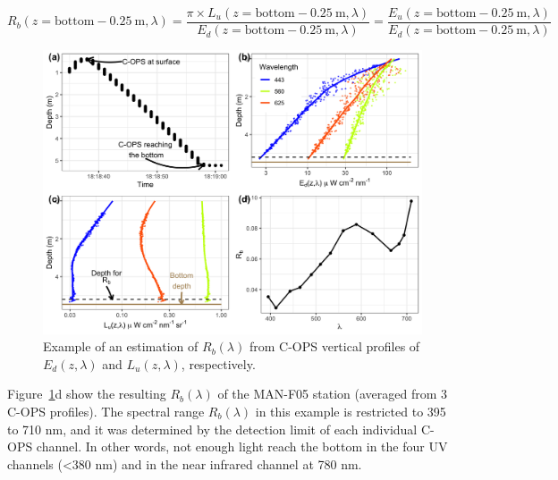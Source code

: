 \documentclass[essd, manuscript]{copernicus}
\begin{document}
\begin{equation}
    R_b(z = \mathrm{bottom-0.25~m}, \lambda) = \frac{\pi \times L_u(z = \mathrm{bottom-0.25~m}, \lambda)}{E_d(z = \mathrm{bottom-0.25~m}, \lambda)} = \frac{E_u(z = \mathrm{bottom-0.25~m}, \lambda)}{E_d(z = \mathrm{bottom-0.25~m}, \lambda)}
\end{equation}

\begin{figure}
    \centering
    \includegraphics[width=18cm]{Figures/Fig_Rb.png}
    \caption{Example of an estimation of $R_b(\lambda)$  from C-OPS vertical profiles of $E_d(z,\lambda)$ and $L_u(z,\lambda)$, respectively.   }
    \label{fig:Rb}
\end{figure}
Figure~\ref{fig:Rb}d show the resulting $R_b(\lambda)$ of the MAN-F05 station (averaged from 3 C-OPS profiles). The spectral range $R_b(\lambda)$ in this example is restricted to 395 to 710 nm, and it was determined by the detection limit of each individual C-OPS channel. In other words, not enough light reach the bottom in the four UV channels (<380 nm) and in the near infrared channel at 780 nm.\\       
\end{document}

